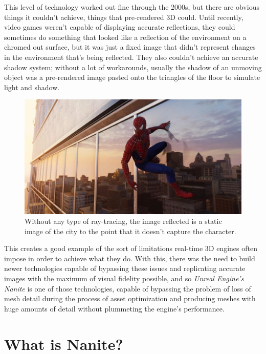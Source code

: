 \documentclass[10pt,journal,compsoc]{IEEEtran}
\begin{document}
\par This level of technology worked out fine through the 2000s, but there are obvious things it couldn't achieve, things that pre-rendered 3D could. Until recently, video games weren't capable of displaying accurate reflections, they could sometimes do something that looked like a reflection of the environment on a chromed out surface, but it was just a fixed image that didn't represent changes in the environment that's being reflected. They also couldn't achieve an accurate shadow system; without a lot of workarounds, usually the shadow of an unmoving object was a pre-rendered image pasted onto the triangles of the floor to simulate light and shadow.

\begin{figure}[H]
    \centering
    \includegraphics[scale=0.14]{img/reflection.jpg}
    \caption{Without any type of ray-tracing, the image reflected is a static image of the city to the point that it doesn't capture the character\cite{refl}.}
    \label{fig:reflect}
\end{figure}

This creates a good example of the sort of limitations real-time 3D engines often impose in order to achieve what they do. With this, there was the need to build newer technologies capable of bypassing these issues and replicating accurate images with the maximum of visual fidelity possible, and so \textit{Unreal Engine's Nanite} is one of those technologies, capable of bypassing the problem of loss of mesh detail during the process of asset optimization and producing meshes with huge amounts of detail without plummeting the engine's performance.


\section{What is Nanite?}
\label{subsec:2.1}
\end{document}
